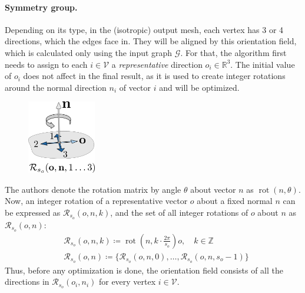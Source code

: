 \documentclass{ACGSeminar}
\DeclareMathOperator{\rot}{rot}
\begin{document}
\paragraph{Symmetry group.}
Depending on its type, in the (isotropic) output mesh, each vertex has 3 or 4 directions, which the edges face in. They will be aligned by this orientation field, which is calculated only using the input graph $\mathcal{G}$. For that, the algorithm first needs to assign to each $i \in \mathcal{V}$ a \textit{representative} direction $o_i \in \mathbb{R}^3$. The initial value of $o_i$ does not affect in the final result, as it is used to create integer rotations around the normal direction $n_i$ of vector $i$ and will be optimized.\bigskip

\begin{figure}
	\includegraphics[width=3cm]{img/integer-rotation.png}\par
	\label{fig:integer-rotation}
\end{figure}

The authors denote the rotation matrix by angle $\theta$ about vector $n$ as $\rot(n, \theta)$. Now, an integer rotation of a representative vector $o$ about a fixed normal $n$ can be expressed as $\mathcal{R}_{s_o}(o,n,k)$, and the set of all integer rotations of $o$ about $n$ as $\mathcal{R}_{s_o}(o,n)$:
\begin{equation*}
\begin{split}
	& \mathcal{R}_{s_o}(o,n,k) \coloneqq \rot(n, k \cdot \frac{2\pi}{s_o})o, \quad k \in \mathbb{Z} \\
	& \mathcal{R}_{s_o}(o,n) \coloneqq \{\mathcal{R}_{s_o}(o,n,0), \dots, \mathcal{R}_{s_o}(o,n,s_o-1)\}
\end{split}
\end{equation*}
Thus, before any optimization is done, the orientation field consists of all the directions in $\mathcal{R}_{s_o}(o_i, n_i)$ for every vertex $i \in \mathcal{V}$.
\end{document}

